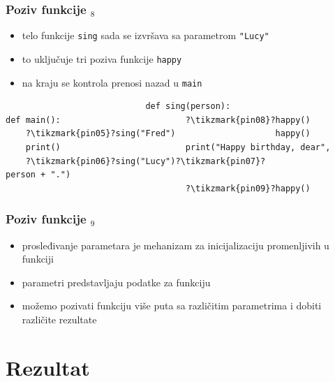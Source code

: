 \documentclass[compress]{beamer}
\begin{document}
\begin{frame}[fragile]
  \frametitle{Poziv funkcije $_8$}
  \begin{itemize}
    \item telo funkcije \texttt{sing} sada se izvršava sa parametrom \texttt{"Lucy"}
    \item to uključuje tri poziva funkcije \texttt{happy}
    \item na kraju se kontrola prenosi nazad u \texttt{main}
  \end{itemize}
\begin{verbatim}
                            def sing(person):
def main():                         ?\tikzmark{pin08}?happy()
    ?\tikzmark{pin05}?sing("Fred")                    happy()
    print()                         print("Happy birthday, dear", 
    ?\tikzmark{pin06}?sing("Lucy")?\tikzmark{pin07}?                          person + ".")
                                    ?\tikzmark{pin09}?happy()
\end{verbatim}
\end{frame}

\begin{frame}[fragile]
  \frametitle{Poziv funkcije $_9$}
  \begin{itemize}
    \item prosleđivanje parametara je mehanizam za inicijalizaciju promenljivih u funkciji
    \item parametri predstavljaju  podatke za funkciju
    \item možemo pozivati funkciju više puta sa različitim parametrima i dobiti različite rezultate
  \end{itemize}
\end{frame}

\section{Rezultat}
\end{document}
